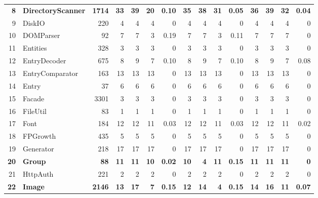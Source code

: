 \documentclass[conference]{IEEEtran}
\begin{document}
\begin{table} [htp!]
{\begin{tabularx}{0.91 \textwidth}{|r|l|r|r|r|r|r|r|r|r|r|r|r|r|r|}
\textbf{8}						& \textbf{DirectoryScanner}			&\textbf{1714}		& \textbf{33}		&	\textbf{39}	&	\textbf{20}	& 	\textbf{0.10}					& \textbf{35}		& \textbf{38} 		& \textbf{31}		& 		\textbf{0.05}			& \textbf{36}			& \textbf{39}			& \textbf{32}			&	\textbf{0.04}\\      
9						& DiskIO					&220		& 4		&	4	&	4	& 	0					& 4		& 4 		& 4		& 		0			& 4			& 4			& 4			&	0\\      
10						& DOMParser				&92			& 7		&	7	&	3	& 	0.19					& 7		& 7 		& 3		& 		0.11			& 7			& 7			& 7			&	0\\      
11						& Entities					&328		& 3		&	3	&	3	& 	0					& 3		& 3 		& 3		& 		0			& 3			& 3			& 3			&	0\\      
12						& EntryDecoder			&675		& 8		&	9	&	7	& 	0.10					& 8		& 9 		& 7		& 		0.10			& 8			& 9			& 7			&	0.08\\   
13						& EntryComparator			&163		& 13		&	13	&	13	& 	0					& 13		& 13 		& 13		& 		0			& 13			& 13			& 13			&	0\\      
14						& Entry					&37			& 6		&	6	&	6	& 	0					& 6		& 6 		& 6		& 		0			& 6			& 6			& 6			&	0\\   
15						& Facade					&3301		& 3		&	3	&	3	& 	0					& 3		& 3 		& 3		& 		0			& 3			& 3			& 3			&	0\\   
16						& FileUtil					&83			& 1		&	1	&	1	& 	0					& 1		& 1 		& 1		& 		0			& 1			& 1			& 1			&	0\\      
17						& Font					&184		&12		&	12	&	11	& 	0.03					& 12		& 12 		& 11		& 		0.03			& 12			& 12			& 11			&	0.02\\        
18						& FPGrowth				&435		& 5		&	5	&	5	& 	0					& 5		&  5		& 5		& 		0			& 5			& 5			& 5			&	0	\\       
19						& Generator				&218		& 17		&	17	&	17	& 	0					& 17		& 17 		& 17		& 		0			& 17			& 17			& 17			&	0	\\      
\textbf{20}						& \textbf{Group}					&\textbf{88}			& \textbf{11}		&	\textbf{11}	&	\textbf{10}	& 	\textbf{0.02}					& \textbf{10}		& \textbf{4} 		& \textbf{11}		& 		\textbf{0.15}			& \textbf{11}			& \textbf{11}			& \textbf{11}			&	\textbf{0}	\\      
21						& HttpAuth				&221		& 2		&	2	&	2	& 	0					& 2		& 2 		& 2		& 		0			& 2			& 2			& 2			&	0	\\         
\textbf{22}						& \textbf{Image}					&\textbf{2146}		& \textbf{13}		&	\textbf{17}	&	\textbf{7}	& 	\textbf{0.15}					& \textbf{12}		& \textbf{14} 		& \textbf{4}	& 		\textbf{0.15}			& \textbf{14}			& \textbf{16}			& \textbf{11}			&	\textbf{0.07}\\        

\end{tabularx}}
\end{table}
\end{document}
